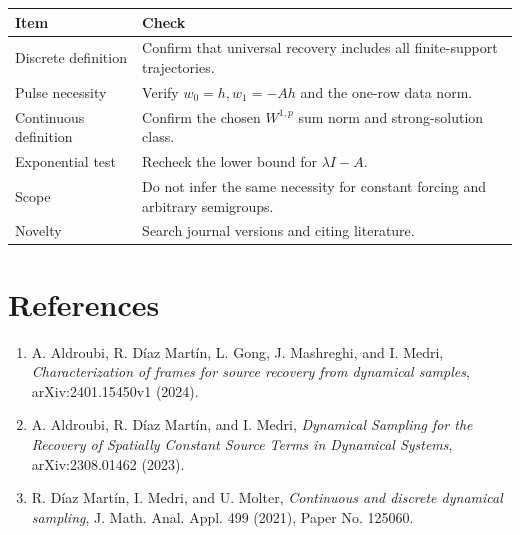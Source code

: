 \documentclass[11pt]{article}
\begin{document}
\begin{tabular}{@{}p{}p{}@{}}
\toprule
Item & Check \\
\midrule
Discrete definition & Confirm that universal recovery includes all finite-support trajectories.\\
Pulse necessity & Verify \(w_0=h,w_1=-Ah\) and the one-row data norm.\\
Continuous definition & Confirm the chosen \(W^{1,p}\) sum norm and strong-solution class.\\
Exponential test & Recheck the lower bound for \(\lambda I-A\).\\
Scope & Do not infer the same necessity for constant forcing and arbitrary semigroups.\\
Novelty & Search journal versions and citing literature.\\
\bottomrule
\end{tabular}

\section*{References}

\begin{enumerate}
\item A. Aldroubi, R. D\'iaz Mart\'in, L. Gong, J. Mashreghi, and I. Medri,
\emph{Characterization of frames for source recovery from dynamical samples},
arXiv:2401.15450v1 (2024).
\item A. Aldroubi, R. D\'iaz Mart\'in, and I. Medri,
\emph{Dynamical Sampling for the Recovery of Spatially Constant Source Terms
in Dynamical Systems}, arXiv:2308.01462 (2023).
\item R. D\'iaz Mart\'in, I. Medri, and U. Molter,
\emph{Continuous and discrete dynamical sampling}, J. Math. Anal. Appl. 499
(2021), Paper No. 125060.
\end{enumerate}
\end{document}

